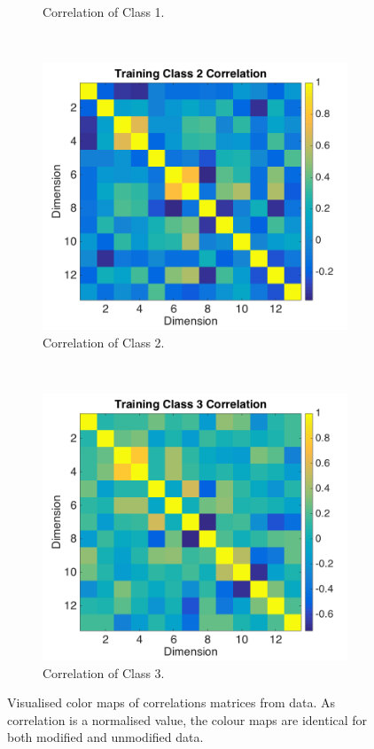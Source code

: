 \documentclass[a4paper, 10pt, conference]{ieeeconf}
\begin{document}
\begin{figure}[!ht]
\begin{subfigure}{0.45\textwidth}
      \caption{Correlation of Class 1.}
      \label{fig:corrclass1}
    \end{subfigure}
    \\
    \begin{subfigure}{0.45\textwidth}
      \includegraphics[width=\textwidth]{pic/corrclass2.png}
      \caption{Correlation of Class 2.}
      \label{fig:corrclass2}
    \end{subfigure}
    ~
    \begin{subfigure}{0.45\textwidth}
      \includegraphics[width=\textwidth]{pic/corrclass3.png}
      \caption{Correlation of Class 3.}
      \label{fig:corrclass3}
    \end{subfigure}
	\caption{Visualised color maps of correlations matrices from data. As correlation is a normalised value, the colour maps are identical for both modified and unmodified data. }
  \label{fig:corrall}
\end{figure}
\newpage
\end{document}
